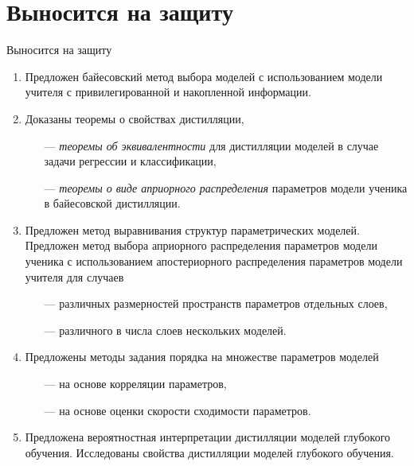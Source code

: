 \documentclass[10pt,pdf,hyperref={unicode}]{beamer}
\begin{document}
\section{Выносится на защиту}
\begin{frame}{Выносится на защиту}
\justifying
	\begin{enumerate}
	\justifying
	    \item Предложен байесовский метод выбора моделей с использованием модели учителя с привилегированной и накопленной информации.
        \item Доказаны теоремы о свойствах дистилляции, 
        \begin{itemize}
            \item[---] \emph{теоремы об эквивалентности} для дистилляции моделей в случае задачи регрессии и классификации,
            \item[---] \emph{теоремы о виде априорного распределения} параметров модели ученика в байесовской дистилляции.
        \end{itemize}
        \item Предложен метод выравнивания структур параметрических моделей. Предложен метод выбора априорного распределения параметров модели ученика с использованием апостериорного распределения параметров модели учителя для случаев
        \begin{itemize}
            \item[---] различных размерностей пространств параметров отдельных слоев,
            \item[---] различного в числа слоев нескольких моделей.
        \end{itemize}
        \item Предложены методы задания порядка на множестве параметров моделей
        \begin{itemize}
            \item[---] на основе корреляции параметров,
            \item[---] на основе оценки скорости сходимости параметров.
        \end{itemize}
        \item Предложена вероятностная интерпретации дистилляции моделей глубокого обучения. Исследованы свойства дистилляции моделей глубокого обучения.
	\end{enumerate}
\end{frame}
\end{document}

